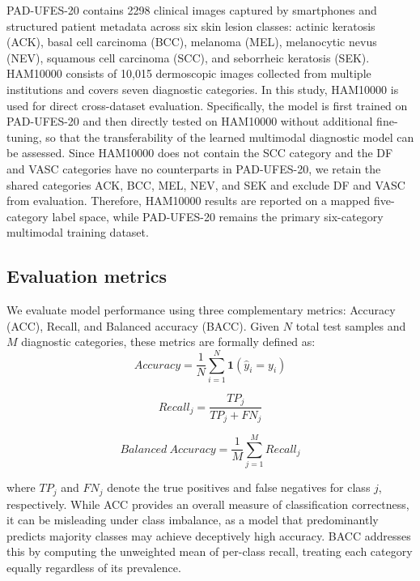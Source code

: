 \documentclass[preprint,12pt]{elsarticle}
\makeatletter
\def@NAT@last@yr{--\NAT@penalty}%
\makeatother
\begin{document}
PAD-UFES-20 contains 2298 clinical images captured by smartphones and structured patient metadata across six skin lesion classes: actinic keratosis (ACK), basal cell carcinoma (BCC), melanoma (MEL), melanocytic nevus (NEV), squamous cell carcinoma (SCC), and seborrheic keratosis (SEK). HAM10000 consists of 10,015 dermoscopic images collected from multiple institutions and covers seven diagnostic categories. In this study, HAM10000 is used for direct cross-dataset evaluation. Specifically, the model is first trained on PAD-UFES-20 and then directly tested on HAM10000 without additional fine-tuning, so that the transferability of the learned multimodal diagnostic model can be assessed. Since HAM10000 does not contain the SCC category and the DF and VASC categories have no counterparts in PAD-UFES-20, we retain the shared categories ACK, BCC, MEL, NEV, and SEK and exclude DF and VASC from evaluation. Therefore, HAM10000 results are reported on a mapped five-category label space, while PAD-UFES-20 remains the primary six-category multimodal training dataset.



\subsection{Evaluation metrics}
We evaluate model performance using three complementary metrics: Accuracy (ACC), Recall, and Balanced accuracy (BACC). Given $N$ total test samples and $M$ diagnostic categories, these metrics are formally defined as: 
\begin{equation}
	Accuracy = \frac{1}{N} \sum_{i=1}^{N} \mathbf{1}(\hat{y}_i = y_i)
\end{equation}

\begin{equation}
	Recall_j = \frac{TP_j}{TP_j + FN_j}
\end{equation}

\begin{equation}
	Balanced\ Accuracy = \frac{1}{M} \sum_{j=1}^{M} Recall_j
\end{equation}


where $TP_j$ and $FN_j$ denote the true positives and false negatives for class $j$, respectively. While ACC provides an overall measure of classification correctness, it can be misleading under class imbalance, as a model that predominantly predicts majority classes may achieve deceptively high accuracy. BACC addresses this by computing the unweighted mean of per-class recall, treating each category equally regardless of its prevalence. 
\end{document}
